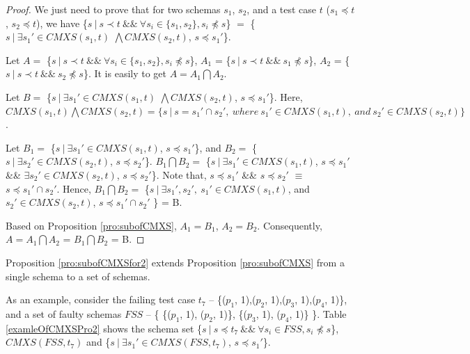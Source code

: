 \begin{proof}

We just need to prove that for two schemas $s_{1}$, $s_{2}$, and a test case $t$ ($s_{1} \preceq t$, $s_{2} \preceq t$), we have \{$s\ |\ s \prec t\ \&\&\ \forall s_{i} \in \{s_{1}, s_{2}\}, s_{i} \npreceq s $\} $=$  \{$ s\ |\ \exists s_{1}' \in CMXS(s_{1}, t)$ $\bigwedge CMXS(s_{2}, t)$, $s \preceq s_{1}'$\}.

Let $A = $ \{$s\ |\ s \prec t\ \&\&\ \forall s_{i} \in \{s_{1}, s_{2}\}, s_{i} \npreceq s $\}, $A_{1}$ = \{$s\ |\ s \prec t\ \&\&\  s_{1} \npreceq s $\}, $A_{2}$ = \{$s\ |\ s \prec t\ \&\&\  s_{2} \npreceq s $\}. It is easily to get $A = A_{1} \bigcap A_{2}$.

Let $B = $ \{$ s\ |\ \exists s_{1}' \in CMXS(s_{1}, t)$ $\bigwedge CMXS(s_{2}, t)$, $s \preceq s_{1}'$\}. Here,  $ CMXS(s_{1}, t) \bigwedge CMXS(s_{2}, t) = \{ s\ |\ s = s_{1}' \cap s_{2}',\ where\ s_{1}' \in CMXS(s_{1}, t),\ and\ s_{2}' \in CMXS(s_{2}, t) \}$.

Let $B_{1} = $ \{$ s\ |\ \exists s_{1}' \in CMXS(s_{1}, t)$, $s \preceq s_{1}'$\}, and $B_{2} = $ \{$ s\ |\ \exists s_{2}' \in CMXS(s_{2}, t)$, $s \preceq s_{2}'$\}. $B_{1} \bigcap B_{2} = $ \{$ s\ |\ \exists s_{1}' \in CMXS(s_{1}, t)$, $s \preceq s_{1}'$ \&\& $\exists s_{2}' \in CMXS(s_{2}, t)$, $s \preceq s_{2}'$\}. Note that, $s \preceq s_{1}'$ \&\& $s \preceq s_{2}'$ $\equiv$ $s \preceq s_{1}' \cap s_{2}'$. Hence, $B_{1} \bigcap B_{2} = $ \{$ s\ |\ \exists s_{1}', s_{2}',\  s_{1}' \in CMXS(s_{1}, t)$, and $s_{2}' \in CMXS(s_{2}, t)$, $s \preceq s_{1}' \cap s_{2}'$ \} = B.

Based on Proposition \ref{pro:subofCMXS}, $A_{1} = B_{1}$, $A_{2} = B_{2}$. Consequently,
$A = A_{1} \bigcap A_{2}$ = $B_{1} \bigcap B_{2}$  = B.

\end{proof}

Proposition \ref{pro:subofCMXSfor2} extends Proposition \ref{pro:subofCMXS} from a single schema to a set of schemas.


As an example, consider the failing test case $t_{7}$ -- \{($p_{1}$, 1),($p_{2}$, 1),($p_{3}$, 1),($p_{4}$, 1)\}, and a set of faulty schemas  $FSS$ -- \{ \{($p_{1}$, 1), ($p_{2}$, 1)\},  \{($p_{3}$, 1), ($p_{4}$, 1)\} \}. Table \ref{examleOfCMXSPro2} shows the schema set \{$s\ |\ s \preceq t_{7}\ \&\&\ \forall s_{i} \in FSS, s_{i} \npreceq s $\}, $CMXS(FSS, t_{7})$ and \{$ s\ |\ \exists s_{1}' \in CMXS(FSS, t_{7})$, $s \preceq s_{1}'$\}.

